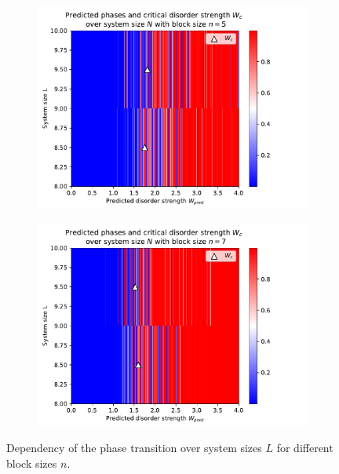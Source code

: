 \documentclass[reprint,amsmath,amssymb,aps,prb]{revtex4-2}
\begin{document}
\begin{center}
\begin{figure}[H]
\begin{subfigure}[c]{0.45\textwidth}
		\end{subfigure}
		\begin{subfigure}[c]{0.45\textwidth}
			\includegraphics[width=\textwidth]{../results/Wc/n5_Wc_N_dependency.pdf}
		\end{subfigure}
		\begin{subfigure}[c]{0.45\textwidth}
			\includegraphics[width=\textwidth]{../results/Wc/n7_Wc_N_dependency.pdf}
		\end{subfigure}
		\caption{Dependency of the phase transition over system sizes $L$ for different block sizes $n$.}
		\label{fig:wcextract}
	\end{figure}
\end{center}
\twocolumngrid
\end{document}
